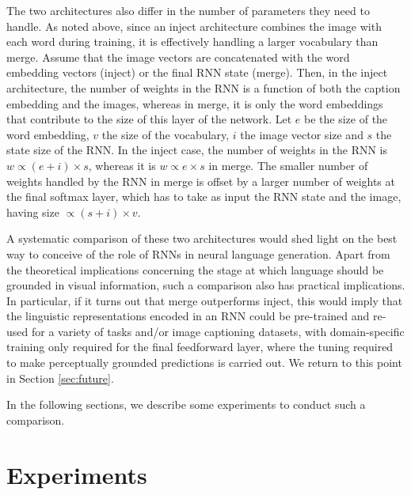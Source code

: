\documentclass[11pt,letterpaper]{article}
\begin{document}
The two architectures also differ in the number of parameters they need to handle. As noted above, since an inject architecture combines the image with each word during training, it is effectively handling a larger vocabulary than merge. Assume that the image vectors are concatenated with the word embedding vectors (inject) or the final RNN state (merge). Then, in the inject architecture, the number of weights in the RNN is a function of both the caption embedding and the images, whereas in merge, it is only the word embeddings that contribute to the size of this layer of the network. Let $e$ be the size of the word embedding, $v$ the size of the vocabulary, $i$ the image vector size and $s$ the state size of the RNN. In the inject case, the number of weights in the RNN is $w \propto (e+i) \times s$, whereas it is $w \propto e \times s$ in merge. The smaller number of weights handled by the RNN in merge is offset by a larger number of weights at the final softmax layer, which has to take as input the RNN state and the image, having size $\propto (s + i) \times v$.

A systematic comparison of these two architectures would shed light on the best way to conceive of the role of RNNs in neural language generation. Apart from the theoretical implications concerning the stage at which language should be grounded in visual information, such a comparison also has practical implications. In particular, if it turns out that merge outperforms inject, this would imply that the linguistic representations encoded in an RNN could be pre-trained and re-used for a variety of tasks and/or image captioning datasets, with domain-specific training only required for the final feedforward layer, where the tuning required to make perceptually grounded predictions is carried out. We return to this point in Section \ref{sec:future}.

In the following sections, we describe some experiments to conduct such a comparison.

\section{Experiments}\label{sec:experiments}
\end{document}
